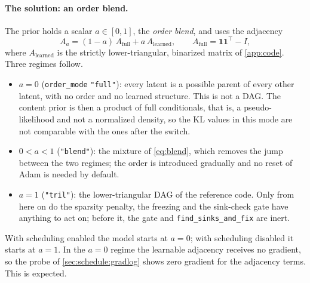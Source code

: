 \paragraph{The solution: an order blend.}
The prior holds a scalar $a\in[0,1]$, the \emph{order blend}, and uses the adjacency
\begin{equation}
A_a=(1-a)\,A_{\mathrm{full}}+a\,A_{\mathrm{learned}},\qquad
A_{\mathrm{full}}=\mathbf 1\mathbf 1^\top-I,
\label{eq:blend}
\end{equation}
where $A_{\mathrm{learned}}$ is the strictly lower-triangular, binarized matrix of
\cref{app:code}. Three regimes follow.
\begin{itemize}[leftmargin=1.5em]
\item $a=0$ (\texttt{order\_mode} \texttt{"full"}): every latent is a possible parent of
      every other latent, with no order and no learned structure. This is not a DAG.
      The content prior is then a product of full conditionals, that is, a
      pseudo-likelihood and not a normalized density, so the KL values in this mode
      are not comparable with the ones after the switch.
\item $0<a<1$ (\texttt{"blend"}): the mixture of \cref{eq:blend}, which removes the
      jump between the two regimes; the order is introduced gradually and no reset of
      Adam is needed by default.
\item $a=1$ (\texttt{"tril"}): the lower-triangular DAG of the reference code. Only
      from here on do the sparsity penalty, the freezing and the sink-check gate
      have anything to act on; before it, the gate and \texttt{find\_sinks\_and\_fix}
      are inert.
\end{itemize}
With scheduling enabled the model starts at $a=0$; with scheduling disabled it starts
at $a=1$. In the $a=0$ regime the learnable adjacency receives no gradient, so the
probe of \cref{sec:schedule:gradlog} shows zero gradient for the adjacency terms.
This is expected.

